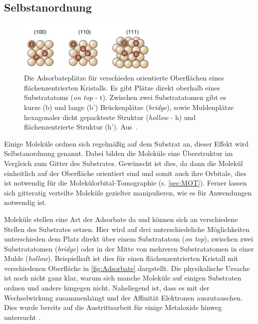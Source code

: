         \subsection{Selbstanordnung}
            \begin{figure}
                \centering
                \includegraphics[width=0.6\textwidth]{./content/pictures/Adsorbate}
                \caption{Die Adsorbateplätze für verschieden orientierte Oberflächen eines flächenzentrierten Kristalls.
                Es gibt Plätze direkt oberhalb eines Substratatoms (\textit{on top} - t).
                Zwischen zwei Substratatomen gibt es kurze (b) und lange (b') Brückenplätze (\textit{bridge}), sowie Muldenplätze hexagonaler dicht gepackteste Struktur (\textit{hollow} - h) und flächenzentrierte Struktur (h'). Aus~\cite{Fauster}.}
                \label{fig:Adsorbate}
            \end{figure}
            Einige Moleküle ordnen sich regelmäßig auf dem Substrat an, dieser Effekt wird Selbstanordnung genannt.
            Dabei bilden die Moleküle eine Überstruktur im Vergleich zum Gitter des Substrates.
            Gewünscht ist dies, da dann die Molekül einheitlich auf der Oberfläche orientiert sind und somit auch ihre Orbitale, dies ist notwendig für die Molekülorbital-Tomographie (s. \autoref{sec:MOT}).
            Ferner lassen sich gitteratig verteilte Moleküle gezielter manipulieren, wie es für Anwendungen notwendig ist.
            
            Moleküle stellen eine Art der Adsorbate da und können sich an verschiedene Stellen des Substrates setzen.
            Hier wird auf drei unterschiedeliche Möglichkeiten unterschieden dem Platz direkt über einem Substratatom (\textit{on top}), zwischen zwei Substratatomen (\textit{bridge}) oder in der Mitte von mehreren Substratatomen in einer Mulde (\textit{hollow}).
            Beispielhaft ist dies für einen flächenzentrierten Kristall mit verschiedenen Oberfläche in \autoref{fig:Adsorbate} dargstellt.
            Die physikalische Ursache ist noch nicht ganz klar, warum sich manche Moleküle auf einigen Substraten ordnen und andere hingegen nicht.
            Naheliegend ist, dass es mit der Wechselwirkung zusammenhängt und der Affinität Elektronen auszutauschen.
            Dies wurde bereits auf die Austrittsarbeit für einige Metaloxide hinweg untersucht \cite{greiner_universal_2012}.

